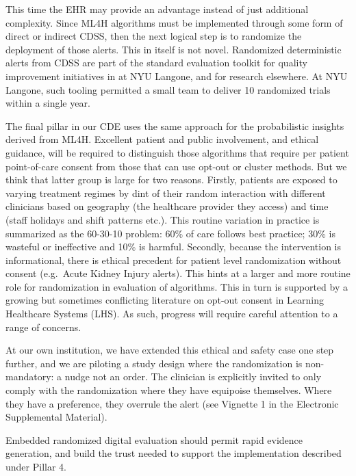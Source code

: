 This time the EHR may provide an advantage instead of just additional
complexity. Since ML4H algorithms must be implemented through some form
of direct or indirect CDSS, then the next logical step is to randomize
the deployment of those alerts. This in itself is not novel. Randomized
deterministic alerts from CDSS are part of the standard evaluation
toolkit for quality improvement initiatives in at NYU
Langone\citep{horwitz2019}, and for research
elsewhere.\citep{wilson2021} At NYU Langone, such tooling permitted a
small team to deliver 10 randomized trials within a single
year.\citep{horwitz2019}

The final pillar in our CDE uses the same approach for the probabilistic
insights derived from ML4H. Excellent patient and public involvement,
and ethical guidance, will be required to distinguish those algorithms
that require per patient point-of-care consent from those that can use
opt-out or cluster methods. But we think that latter group is large for
two reasons. Firstly, patients are exposed to varying treatment regimes
by dint of their random interaction with different clinicians based on
geography (the healthcare provider they access) and time (staff holidays
and shift patterns etc.). This routine variation in practice is
summarized as the 60-30-10 problem: 60\% of care follows best practice;
30\% is wasteful or ineffective and 10\% is
harmful.\citep{braithwaite2020} Secondly, because the intervention is
informational, there is ethical precedent for patient level
randomization without consent (e.g.~Acute Kidney Injury
alerts).\citep{wilson2021} This hints at a larger and more routine role
for randomization in evaluation of algorithms. This in turn is supported
by a growing\citep{halpern2018, london2018a, scobie2020} but sometimes
conflicting\citep{meyer2019} literature on opt-out consent in Learning
Healthcare Systems (LHS). As such, progress will require careful
attention to a range of concerns.

At our own institution, we have extended this ethical and safety case
one step further, and we are piloting a study design where the
randomization is non-mandatory: a nudge not an order.\citep{wilson2022}
The clinician is explicitly invited to only comply with the
randomization where they have equipoise themselves. Where they have a
preference, they overrule the alert (see Vignette 1 in the Electronic
Supplemental Material).

Embedded randomized digital evaluation should permit rapid evidence
generation, and build the trust needed to support the implementation
described under Pillar 4.

